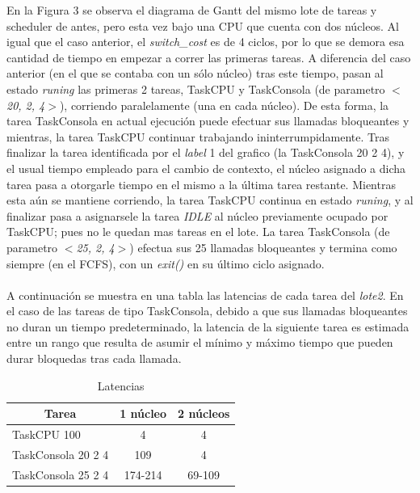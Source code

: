En la Figura 3 se observa el diagrama de Gantt del mismo lote de tareas y scheduler de antes, pero esta vez bajo una CPU que cuenta con dos n\'ucleos. Al igual que el caso anterior, el \textit{switch\_cost} es de 4 ciclos, por lo que se demora esa cantidad de tiempo en empezar a correr las primeras tareas. A diferencia del caso anterior (en el que se contaba con un s\'olo n\'ucleo) tras este tiempo, pasan al estado \textit{runing} las primeras 2 tareas, TaskCPU y TaskConsola (de parametro \textit{$<$20, 2, 4$>$}), corriendo paralelamente (una en cada núcleo). De esta forma, la tarea TaskConsola en actual ejecuci\'on puede efectuar sus llamadas bloqueantes y mientras, la tarea TaskCPU continuar trabajando ininterrumpidamente. Tras finalizar la tarea identificada por el \textit{label} 1 del grafico (la TaskConsola 20 2 4), y el usual tiempo empleado para el cambio de contexto, el n\'ucleo asignado a dicha tarea pasa a otorgarle tiempo en el mismo a la \'ultima tarea restante. Mientras esta aún se mantiene corriendo, la tarea TaskCPU continua en estado \textit{runing}, y al finalizar pasa a asignarsele la tarea \textit{IDLE} al n\'ucleo previamente ocupado por TaskCPU; pues no le quedan mas tareas en el lote. La tarea TaskConsola (de parametro \textit{$<$25, 2, 4$>$}) efectua sus 25 llamadas bloqueantes y termina como siempre (en el FCFS), con un \textit{exit()} en su \'ultimo ciclo asignado.
\\
\\
A continuaci\'on se muestra en una tabla las latencias de cada tarea del \textit{lote2}. En el caso de las tareas de tipo TaskConsola, debido a que sus llamadas bloqueantes no duran un tiempo predeterminado, la latencia de la siguiente tarea es estimada entre un rango que resulta de asumir el mínimo y máximo tiempo que pueden durar bloquedas tras cada llamada.
\begin{table}[H]
\centering
\caption{Latencias}
\label{my-label}
\begin{tabular}{@{}lcc@{}}
\toprule
\multicolumn{1}{c}{Tarea} & 1 núcleo & 2 núcleos \\ \midrule
TaskCPU 100               & 4        & 4         \\
TaskConsola 20 2 4        & 109      & 4         \\
TaskConsola 25 2 4        & 174-214  & 69-109    \\ \bottomrule
\end{tabular}
\end{table}